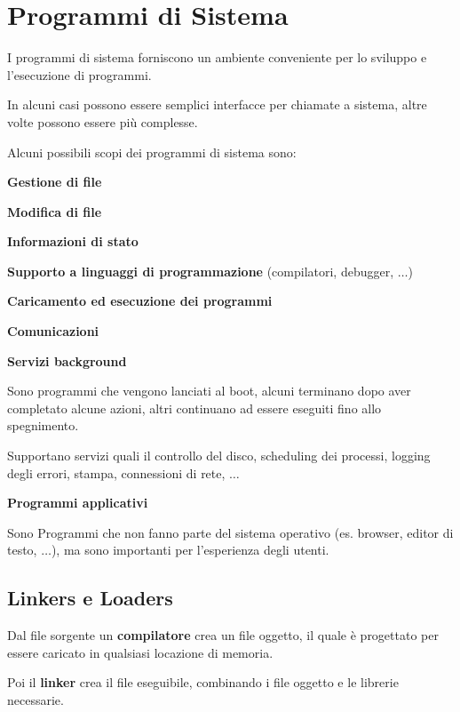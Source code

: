 \section{Programmi di Sistema}
I programmi di sistema forniscono un ambiente conveniente per lo sviluppo e l'esecuzione di programmi.

In alcuni casi possono essere semplici interfacce per chiamate a sistema, altre volte possono essere più complesse.

\spacer
Alcuni possibili scopi dei programmi di sistema sono:

\begin{sitemize}
    \item \textbf{Gestione di file}
    \item \textbf{Modifica di file}
    \item \textbf{Informazioni di stato}
    \item \textbf{Supporto a linguaggi di programmazione} (compilatori, debugger, $\ldots$)
    \item \textbf{Caricamento ed esecuzione dei programmi}
    \item \textbf{Comunicazioni}
    \item \textbf{Servizi background}

    Sono programmi che vengono lanciati al boot, alcuni terminano dopo aver completato alcune azioni, altri continuano ad essere eseguiti fino allo spegnimento.

    Supportano servizi quali il controllo del disco, scheduling dei processi, logging degli errori, stampa, connessioni di rete, $\ldots$

    \item \textbf{Programmi applicativi}

    Sono Programmi che non fanno parte del sistema operativo (es. browser, editor di testo, $\ldots$), ma sono importanti per l'esperienza degli utenti.
\end{sitemize}

\subsection{Linkers e Loaders}

Dal file sorgente un \textbf{compilatore} crea un file oggetto, il quale è progettato per essere caricato in qualsiasi locazione di memoria.

Poi il \textbf{linker} crea il file eseguibile, combinando i file oggetto e le librerie necessarie.

